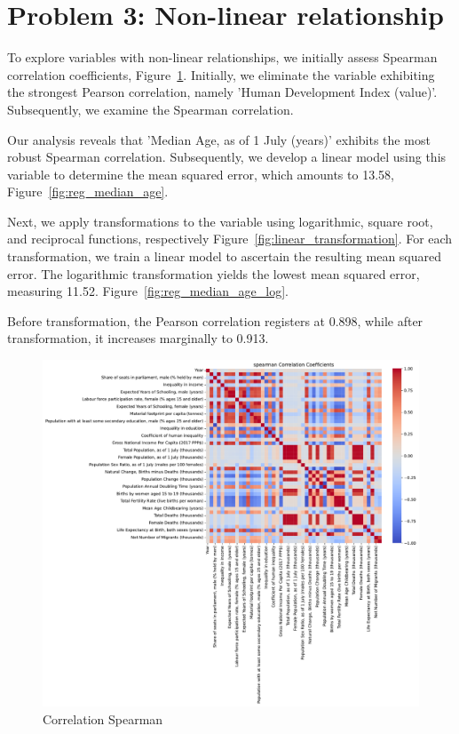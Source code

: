 \documentclass[a4paper]{article}
\begin{document}
\section*{Problem 3: Non-linear relationship}

To explore variables with non-linear relationships, we initially assess Spearman correlation coefficients, Figure~\ref{fig:spearman_correlation}. 
Initially, we eliminate the variable exhibiting the strongest Pearson correlation, namely 'Human Development Index (value)'. Subsequently, we examine the Spearman correlation.

Our analysis reveals that 'Median Age, as of 1 July (years)' exhibits the most robust Spearman correlation. Subsequently, 
we develop a linear model using this variable to determine the mean squared error, which amounts to 13.58, Figure~\ref{fig:reg_median_age}.

Next, we apply transformations to the variable using logarithmic, square root, and reciprocal functions, respectively  Figure~\ref{fig:linear_transformation}. 
For each transformation, we train a linear model to ascertain the resulting mean squared error. The logarithmic transformation yields the lowest mean squared error, measuring 11.52.  Figure~\ref{fig:reg_median_age_log}.

Before transformation, the Pearson correlation registers at 0.898, while after transformation, it increases marginally to 0.913.


\begin{figure}[h]
  \begin{center}
    \includegraphics[width=\textwidth]{ola/spearman_correlation.pdf}
    \caption{Correlation Spearman}
    \label{fig:spearman_correlation}
  \end{center}
\end{figure}
\end{document}
